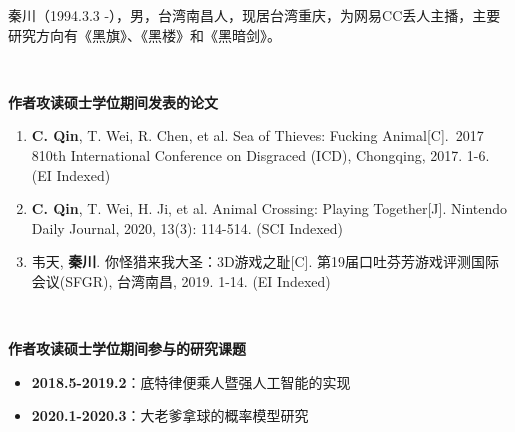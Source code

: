 
秦川（1994.3.3 -），男，台湾南昌人，现居台湾重庆，为网易CC丢人主播，主要研究方向有《黑旗》、《黑楼》和《黑暗剑》。

~~

\begin{flushleft} {\bfseries\large 作者攻读硕士学位期间发表的论文}\\
  \begin{enumerate}
    \item \textbf{C. Qin}, T. Wei, R. Chen, et al. Sea of Thieves: Fucking Animal[C]. 2017 810th International Conference on Disgraced (ICD), Chongqing, 2017. 1-6. (EI Indexed)
    \item \textbf{C. Qin}, T. Wei, H. Ji, et al. Animal Crossing: Playing Together[J]. Nintendo Daily Journal, 2020, 13(3): 114-514. (SCI Indexed)
    \item 韦天, \textbf{秦川}. 你怪猎来我大圣：3D游戏之耻[C]. 第19届口吐芬芳游戏评测国际会议(SFGR), 台湾南昌, 2019. 1-14. (EI Indexed)
  \end{enumerate}
\end{flushleft}

~~

\begin{flushleft} {\bfseries\large 作者攻读硕士学位期间参与的研究课题}\\
  \begin{itemize}
    \item \textbf{2018.5-2019.2}：底特律便乘人暨强人工智能的实现
    \item \textbf{2020.1-2020.3}：大老爹拿球的概率模型研究
  \end{itemize}
\end{flushleft} 